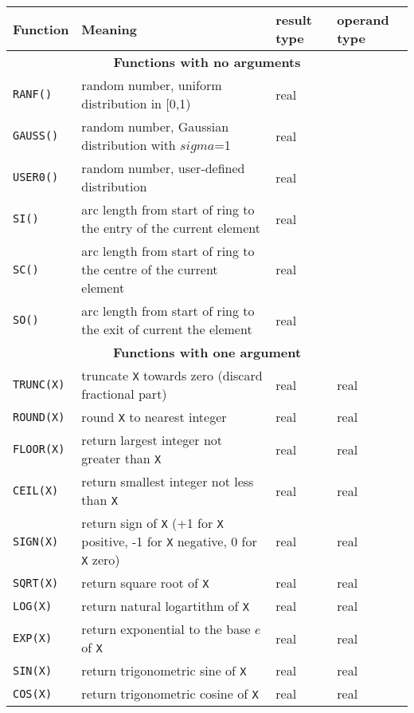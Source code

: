 \documentclass{article}
\begin{document}
\begin{table}[ht]
\begin{center}
\begin{tabular}{|l|p{}|l|l|}
\hline
Function & Meaning & result type & operand type \\
\hline
\multicolumn{4}{|c|}{\textbf{Functions with no arguments}} \\
\hline
\texttt{RANF()} & random number, uniform distribution in [0,1) & real & \\
\hline
\texttt{GAUSS()} &
random number, Gaussian distribution with $sigma$=1 & real & \\
\hline
\texttt{USER0()} & random number, user-defined distribution & real & \\
\hline
\texttt{SI()} &
arc length from start of ring to the entry of the current element &
real & \\
\hline
\texttt{SC()} &
arc length from start of ring to the centre of the current element &
real & \\
\hline
\texttt{SO()} &
arc length from start of ring to the exit of current the element &
real & \\
\hline
\multicolumn{4}{|c}{\textbf{Functions with one argument}} \\
\hline
\texttt{TRUNC(X)} & 
truncate \texttt{X} towards zero (discard fractional part) & real & real \\
\hline
\texttt{ROUND(X)} & round \texttt{X} to nearest integer & real &real \\
\hline
\texttt{FLOOR(X)} & return largest integer not greater than \texttt{X} &
real & real \\
\hline
\texttt{CEIL(X)} &
return smallest integer not less than \texttt{X} & real & real \\
\hline
\texttt{SIGN(X)} & return sign of \texttt{X}
(+1 for \texttt{X} positive, -1 for \texttt{X} negative,
 0 for \texttt{X} zero) & real & real \\
\hline
\texttt{SQRT(X)} & return square root of \texttt{X} & real & real \\
\hline
\texttt{LOG(X)} &
return natural logartithm of \texttt{X} & real & real \\
\hline
\texttt{EXP(X)} &
return exponential to the base $e$ of \texttt{X} & real & real \\
\hline
\texttt{SIN(X)} &
return trigonometric sine of \texttt{X} & real & real \\
\hline
\texttt{COS(X)} & return trigonometric cosine of \texttt{X} & real & real \\

\end{tabular}
\end{center}
\end{table}
\end{document}
